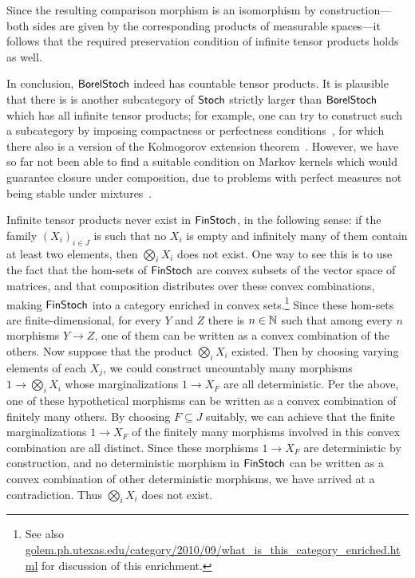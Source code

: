 \documentclass[11pt]{article}
\begin{document}
\begin{example}
	Since the resulting comparison morphism  is an isomorphism by construction---both sides are given by the corresponding products of measurable spaces---it follows that the required preservation condition of infinite tensor products holds as well.

	In conclusion, $\operatorname{\mathsf{BorelStoch}}$ indeed has countable tensor products. It is plausible that there is is another subcategory of $\operatorname{\mathsf{Stoch}}$ strictly larger than $\operatorname{\mathsf{BorelStoch}}$ which has all infinite tensor products; for example, one can try to construct such a subcategory by imposing compactness or perfectness conditions~\cite[\S{451}]{fremlin4}, for which there also is a version of the Kolmogorov extension theorem~\cite[Corollary~454G]{fremlin4}. However, we have so far not been able to find a suitable condition on Markov kernels which would guarantee closure under composition, due to problems with perfect measures not being stable under mixtures~\cite{ramachandran}.
\end{example}

\begin{example}
	\label{infprods_finstoch}
	Infinite tensor products never exist in $\operatorname{\mathsf{FinStoch}}$, in the following sense: if the family $(X_i)_{i \in J}$ is such that no $X_i$ is empty and infinitely many of them contain at least two elements, then $\bigotimes_i X_i$ does not exist. One way to see this is to use the fact that the hom-sets of $\operatorname{\mathsf{FinStoch}}$ are convex subsets of the vector space of matrices, and that composition distributes over these convex combinations, making $\operatorname{\mathsf{FinStoch}}$ into a category enriched in convex sets.\footnote{See also \href{https://golem.ph.utexas.edu/category/2010/09/what_is_this_category_enriched.html}{golem.ph.utexas.edu/category/2010/09/what\_is\_this\_category\_enriched.html} for discussion of this enrichment.} Since these hom-sets are finite-dimensional, for every $Y$ and $Z$ there is $n \in \mathbb{N}$ such that among every $n$ morphisms $Y \to Z$, one of them can be written as a convex combination of the others. Now suppose that the product $\bigotimes_i X_i$ existed. Then by choosing varying elements of each $X_j$, we could construct uncountably many morphisms $1 \to \bigotimes_i X_i$ whose marginalizations $1 \to X_F$ are all deterministic. Per the above, one of these hypothetical morphisms can be written as a convex combination of finitely many others. By choosing $F \subseteq J$ suitably, we can achieve that the finite marginalizations $1 \to X_F$ of the finitely many morphisms involved in this convex combination are all distinct. Since these morphisms $1 \to X_F$ are deterministic by construction, and no deterministic morphism in $\operatorname{\mathsf{FinStoch}}$ can be written as a convex combination of other deterministic morphisms, we have arrived at a contradiction. Thus $\bigotimes_i X_i$ does not exist.
\end{example}
\end{document}
